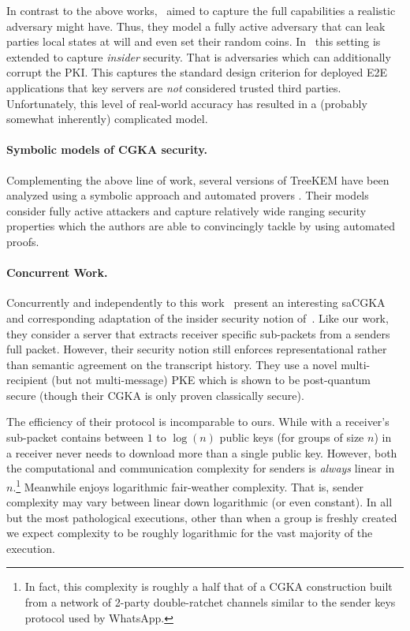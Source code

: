 In contrast to the above works,~\cite{TCC:ACJM20} aimed to capture the full
capabilities a realistic adversary might have. Thus, they model a fully
active adversary that can leak parties local states at will and even set
their random coins. In~\cite{EPRINT:AlwJosMul20} this setting is extended to
capture \emph{insider} security. That is adversaries which can additionally
corrupt the PKI. This captures the standard design criterion for deployed E2E
applications that key servers are \emph{not} considered trusted third
parties. Unfortunately, this level of real-world accuracy has resulted in a
(probably somewhat inherently) complicated model.

\paragraph{Symbolic models of CGKA security.}
Complementing the above line of work, several versions of TreeKEM have been
analyzed using a symbolic approach and automated provers
\cite{bhargavan:hal-02425229}. Their models consider fully active attackers
and capture relatively wide ranging security properties which the authors are
able to convincingly tackle by using automated proofs.

\paragraph{Concurrent Work.}
Concurrently and independently to this work~\cite{hashimoto2021cmpke} present
an interesting saCGKA and corresponding adaptation of the insider security
notion of~\cite{EPRINT:AlwJosMul20}. Like our work, they consider a server
that extracts receiver specific sub-packets from a senders full packet.
However, their security notion still enforces representational rather than
semantic agreement on the transcript history. They use a novel
multi-recipient (but not multi-message) PKE which is shown to be
post-quantum secure (though their CGKA is only proven classically secure).

The efficiency of their protocol is incomparable to ours. While with \saik a
receiver's sub-packet contains between $1$ to $\log(n)$ public keys (for
groups of size $n$) in~\cite{hashimoto2021cmpke} a receiver never needs to
download more than a single public key. However, both the computational and
communication complexity for senders is \emph{always} linear in
$n$.\footnote{In fact, this complexity is roughly a half that of a CGKA
construction built from a network of 2-party double-ratchet channels similar
to the sender keys protocol used by WhatsApp.} Meanwhile \saik enjoys
logarithmic fair-weather complexity. That is, sender complexity may vary
between linear down logarithmic (or even constant). In all but the most
pathological executions, other than when a group is freshly created we expect
complexity to be roughly logarithmic for the vast majority of the execution.


